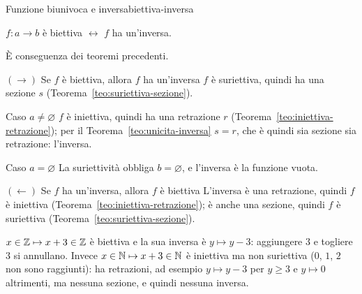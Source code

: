 \begin{concetto}
\begin{Teorema}{Funzione biunivoca e inversa}{biettiva-inversa}
    \begin{prerequisiti}
    \end{prerequisiti}
    $f \colon a \to b$ è biettiva $\leftrightarrow$ $f$ ha un'inversa.
\end{Teorema}
\begin{dimostrazione}
    È conseguenza dei teoremi precedenti.
    \begin{caso}{$(\rightarrow)$ Se $f$ è biettiva, allora $f$ ha un'inversa}
        $f$ è suriettiva, quindi ha una sezione $s$ (Teorema~\ref{teo:suriettiva-sezione}).
        \begin{caso}{Caso $a \neq \varnothing$}
            $f$ è iniettiva, quindi ha una retrazione $r$ (Teorema~\ref{teo:iniettiva-retrazione}); per il
            Teorema~\ref{teo:unicita-inversa} $s = r$, che è quindi sia sezione sia retrazione: l'inversa.
        \end{caso}
        \begin{caso}{Caso $a = \varnothing$}
            La suriettività obbliga $b = \varnothing$, e l'inversa è la funzione vuota.
        \end{caso}
    \end{caso}
    \begin{caso}{$(\leftarrow)$ Se $f$ ha un'inversa, allora $f$ è biettiva}
        L'inversa è una retrazione, quindi $f$ è iniettiva (Teorema~\ref{teo:iniettiva-retrazione}); è anche una
        sezione, quindi $f$ è suriettiva (Teorema~\ref{teo:suriettiva-sezione}).
    \end{caso}
\end{dimostrazione}
\end{concetto}

\begin{spiegazione}
    $x \in \mathbb{Z} \mapsto x + 3 \in \mathbb{Z}$ è biettiva e la sua inversa è $y \mapsto y - 3$: aggiungere $3$ e togliere $3$ si annullano. Invece $x \in \mathbb{N} \mapsto x + 3 \in \mathbb{N}$
    è iniettiva ma non suriettiva ($0$, $1$, $2$ non sono raggiunti): ha retrazioni, ad esempio $y \mapsto y - 3$ per $y \geq 3$ e $y \mapsto 0$ altrimenti, ma nessuna
    sezione, e quindi nessuna inversa.
\end{spiegazione}


